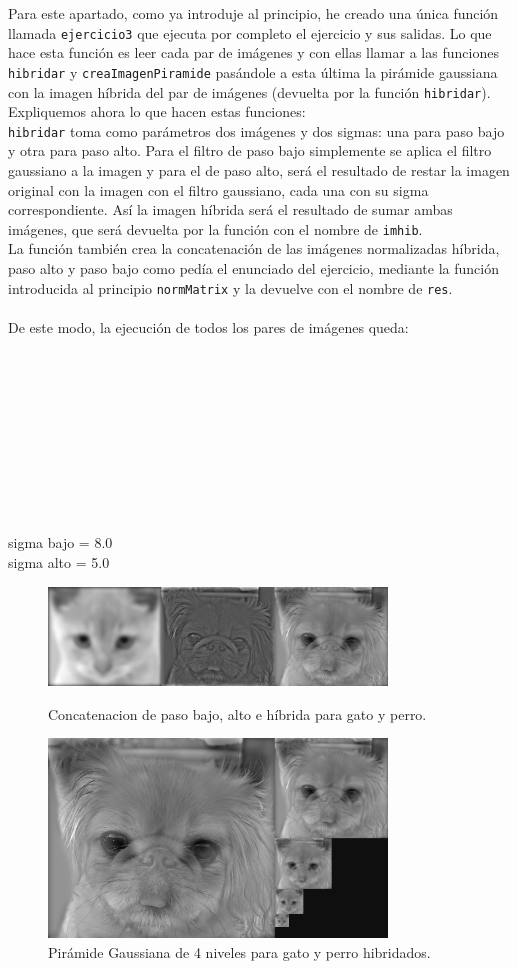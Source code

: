 \documentclass[12pt]{article}
\begin{document}
Para este apartado, como ya introduje al principio, he creado una única función llamada \texttt{ejercicio3} que ejecuta por completo el ejercicio y sus salidas. Lo que hace esta función es leer cada par de imágenes y con ellas llamar a las funciones \texttt{hibridar} y \texttt{creaImagenPiramide} pasándole a esta última la pirámide gaussiana con la imagen híbrida del par de imágenes (devuelta por la función \texttt{hibridar}). Expliquemos ahora lo que hacen estas funciones:\\
\texttt{hibridar} toma como parámetros dos imágenes y dos sigmas: una para paso bajo y otra para paso alto. Para el filtro de paso bajo simplemente se aplica el filtro gaussiano a la imagen y para el de paso alto, será el resultado de restar la imagen original con la imagen con el filtro gaussiano, cada una con su sigma correspondiente. Así la imagen híbrida será el resultado de sumar ambas imágenes, que será devuelta por la función con el nombre de \texttt{imhib}.\\
La función también crea la concatenación de las imágenes normalizadas híbrida, paso alto y paso bajo como pedía el enunciado del ejercicio, mediante la función introducida al principio \texttt{normMatrix} y la devuelve con el nombre de \texttt{res}.\\\\
De este modo, la ejecución de todos los pares de imágenes queda:\\\\\\\\\\\\\\\\\\\\\\
sigma bajo = 8.0\\
sigma alto = 5.0
\begin{figure}[H]
\centering
\parbox{9cm}{
\includegraphics[width=9cm]{images/ImagenGP.png}
\caption{Concatenacion de paso bajo, alto e híbrida para gato y perro.}
\label{fig:2figsA}}
\begin{minipage}{9cm}
\includegraphics[width=9cm]{images/PirGP.png}
\caption{Pirámide Gaussiana de 4 niveles para gato y perro hibridados.}
\label{fig:2figsB}
\end{minipage}
\end{figure}
\end{document}

